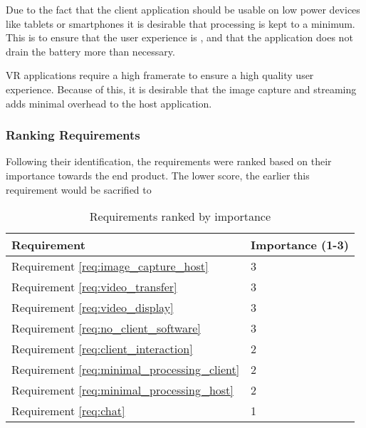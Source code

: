 Due to the fact that the client application should be usable on low power devices like tablets or smartphones it is desirable that processing is kept to a minimum. This is to ensure that the user experience is , and that the application does not drain the battery more than necessary.

VR applications require a high framerate to ensure a high quality user experience. Because of this, it is desirable that the image capture and streaming adds minimal overhead to the host application.

\subsubsection{Ranking Requirements}
Following their identification, the requirements were ranked based on their importance towards the end product. The lower score, the earlier this requirement would be sacrified to 

\begin{table}[]
    \centering
    \begin{tabular}{ | l | l |}
        \hline
        Requirement & Importance (1-3) \\
        \hline
        Requirement \ref{req:image_capture_host}            & 3                 \\
        Requirement \ref{req:video_transfer}                & 3                 \\
        Requirement \ref{req:video_display}                 & 3                 \\
        Requirement \ref{req:no_client_software}            & 3                 \\
        Requirement \ref{req:client_interaction}            & 2                 \\
        Requirement \ref{req:minimal_processing_client}     & 2                 \\
        Requirement \ref{req:minimal_processing_host}       & 2                 \\
        Requirement \ref{req:chat}                          & 1                 \\
        \hline
    \end{tabular}
    \caption{Requirements ranked by importance}
    \label{tab:requirements_ranking}
\end{table}


